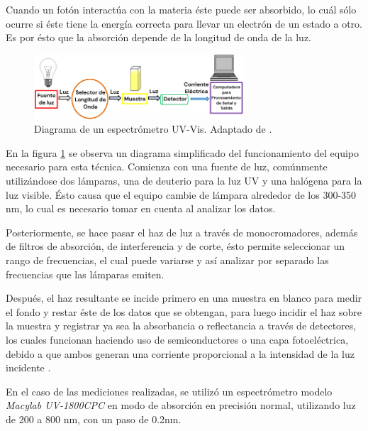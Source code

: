 \documentclass[../main.tex]{subfiles}
\begin{document}
Cuando un fotón interactúa con la materia éste puede ser absorbido, lo cuál sólo ocurre si éste tiene la energía correcta para llevar un electrón de un estado a otro. Es por ésto que la absorción depende de la longitud de onda de la luz.
\begin{figure}[H]
    \centering
    \includegraphics[width=0.7\textwidth]{fig/uvvisdiag.png}
    \caption{Diagrama de un espectrómetro UV-Vis. Adaptado de \cite{Tom2023}.}
    \label{fig:uvvisdiag}
\end{figure}
En la figura \ref{fig:uvvisdiag} se observa un diagrama simplificado del funcionamiento del equipo necesario para esta técnica. Comienza con una fuente de luz, comúnmente utilizándose dos lámparas, una de deuterio para la luz UV y una halógena para la luz visible. Ésto causa que el equipo cambie de lámpara alrededor de los 300-350 nm, lo cual es necesario tomar en cuenta al analizar los datos.

Posteriormente, se hace pasar el haz de luz a través de monocromadores, además de filtros de absorción, de interferencia y de corte, ésto permite seleccionar un rango de frecuencias, el cual puede variarse y así analizar por separado las frecuencias que las lámparas emiten.

Después, el haz resultante se incide primero en una muestra en blanco para medir el fondo y restar éste de los datos que se obtengan, para luego incidir el haz sobre la muestra y registrar ya sea la absorbancia o reflectancia a través de detectores, los cuales funcionan haciendo uso de semiconductores o una capa fotoeléctrica, debido a que ambos generan una corriente proporcional a la intensidad de la luz incidente \cite{Tom2023}.

En el caso de las mediciones realizadas, se utilizó un espectrómetro modelo \textit{Macylab UV-1800CPC} en modo de absorción en precisión normal, utilizando luz de 200 a 800 nm, con un paso de 0.2nm.
\end{document}
